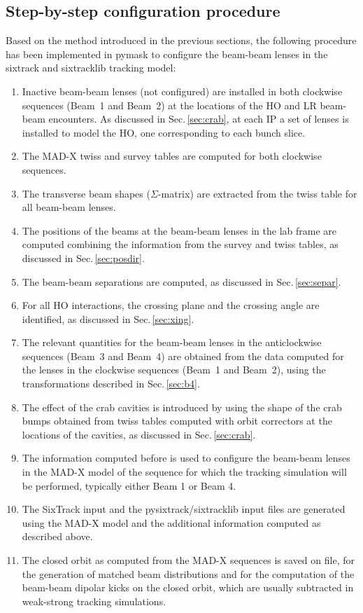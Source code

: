 \subsection{Step-by-step configuration procedure}

Based on the method introduced in the previous sections, the following procedure has been implemented in pymask to configure the beam-beam lenses in the sixtrack and sixtracklib tracking model:

\begin{enumerate}
\item Inactive beam-beam lenses (not configured) are installed in both clockwise sequences (Beam~1 and Beam~2) at the locations of the HO and LR beam-beam encounters. As discussed in Sec.\,\ref{sec:crab}, at each IP a set of lenses is installed to model the HO, one corresponding to each bunch slice.
\item The MAD-X twiss and survey tables are computed 
for both clockwise sequences.
\item The transverse beam shapes ($\Sigma$-matrix) are extracted from the twiss table for all beam-beam lenses.
\item The positions of the beams at the beam-beam lenses in the lab frame are computed combining the information from the survey and twiss tables, as discussed in Sec.\,\ref{sec:posdir}.
\item The beam-beam separations are computed, as discussed in Sec.\,\ref{sec:separ}.
\item For all HO interactions, the crossing plane and the crossing angle are identified, as discussed in Sec.\,\ref{sec:xing}.
\item The relevant quantities for the beam-beam lenses in the anticlockwise sequences (Beam~3 and Beam~4) are obtained from the data computed for the lenses in the clockwise sequences (Beam~1 and Beam~2), using the transformations described in Sec.\,\ref{sec:b4}.
\item The effect of the crab cavities is introduced by using the shape of the crab bumps obtained from twiss tables computed with orbit correctors at the locations of the cavities, as discussed in Sec.\,\ref{sec:crab}.
\item The information computed before is used to configure the beam-beam lenses in the MAD-X model of the sequence for which the tracking simulation will be performed, typically either Beam 1 or Beam 4.
\item The SixTrack input and the pysixtrack/sixtracklib input files are generated  using the MAD-X model and the additional information computed as described above. 
\item The closed orbit as computed from the MAD-X sequences is saved on file, for the generation of matched beam distributions and for the computation of the beam-beam dipolar kicks on the closed orbit, which are usually subtracted in weak-strong tracking simulations.
\end{enumerate}


